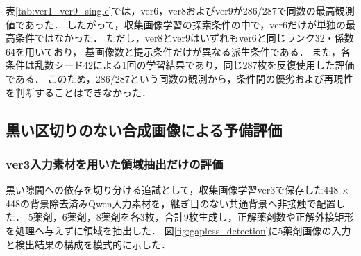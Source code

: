 \documentclass[uplatex,dvipdfmx]{jsarticle}
\begin{document}
表\ref{tab:ver1_ver9_single}では，ver6，ver8およびver9が286/287で同数の最高観測値であった．
したがって，収集画像学習の探索条件の中で，ver6だけが単独の最高条件ではなかった．
ただし，ver8とver9はいずれもver6と同じランク32・係数64を用いており，
基画像数と提示条件だけが異なる派生条件である．
また，各条件は乱数シード42による1回の学習結果であり，同じ287枚を反復使用した評価である．
このため，286/287という同数の観測から，条件間の優劣および再現性を判断することはできなかった．

\subsection{黒い区切りのない合成画像による予備評価}

\subsubsection{ver3入力素材を用いた領域抽出だけの評価}\label{sec:zero_gap_detection}

黒い隙間への依存を切り分ける追試として，収集画像学習ver3で保存した448 $\times$ 448の背景除去済みQwen入力素材を，継ぎ目のない共通背景へ非接触で配置した．
5薬剤，6薬剤，8薬剤を各3枚，合計9枚生成し，正解薬剤数や正解外接矩形を処理へ与えずに領域を抽出した．
図\ref{fig:gapless_detection}に5薬剤画像の入力と検出結果の構成を模式的に示した．
\end{document}
